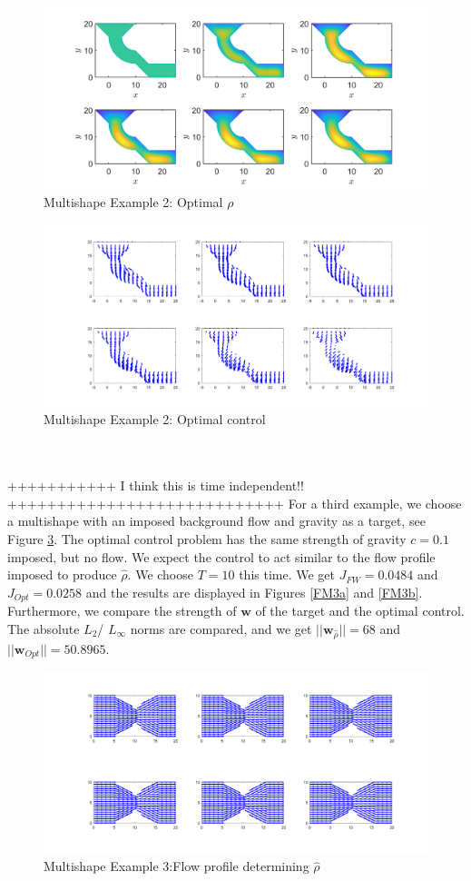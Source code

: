 \documentclass[11pt, a4paper]{article}
\theoremstyle{definition}
\newcommand{\w}{\mathbf{w}}
\newcommand{\hr}{\widehat \rho}
\begin{document}
\begin{figure}[h]
	\centering
	\includegraphics[scale=0.35]{MultiOpt2.png}
	\caption{Multishape Example 2: Optimal $\rho$} 
	\label{FM1a}
\end{figure}
\begin{figure}[h]
	\centering
	\includegraphics[scale=0.35]{MultiCont2.png}
	\caption{Multishape Example 2: Optimal control} 
	\label{FM2a}
\end{figure}
\\
\\
+++++++++++ I think this is time independent!! ++++++++++++++++++++++++++++
For a third example, we choose a multishape with an imposed background flow and gravity as a target, see Figure \ref{FM3}. The optimal control problem has the same strength of gravity $c = 0.1$ imposed, but no flow. We expect the control to act similar to the flow profile imposed to produce $\hr$. We choose $T = 10$ this time.
We get $J_{FW} = 0.0484$ and $J_{Opt} = 0.0258$ and the results are displayed in Figures \ref{FM3a} and \ref{FM3b}. Furthermore, we compare the strength of $\w$ of the target and the optimal control. The absolute $L_2$/ $L_\infty$ norms are compared, and we get $||\w_{\hr}|| = 68$ and $||\w_{Opt}|| = 50.8965$.
\begin{figure}[h]
	\centering
	\includegraphics[scale=0.35]{MultiwFW.png}
	\caption{Multishape Example 3:Flow profile determining $\hr$} 
	\label{FM3}
\end{figure}
\end{document}
